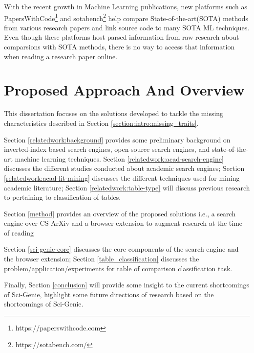 With the recent growth in Machine Learning publications, new platforms such as PapersWithCode\footnote{https://paperswithcode.com} and sotabench\footnote{https://sotabench.com/} help compare State-of-the-art(SOTA) methods from various research papers and link source code to many SOTA ML techniques. Even though these platforms host parsed information from raw research about comparsions with SOTA methods, there is no way to access that information when reading a research paper online. 

\section{Proposed Approach And Overview}
This dissertation focuses on the solutions developed to tackle the missing characteristics described in Section \ref{section:intro:missing_traits}. 

Section \ref{relatedwork:background} provides some preliminary background on inverted-index based search engines, open-source search engines, and state-of-the-art machine learning techniques.
Section \ref{relatedwork:acad-search-engine} discusses the different studies conducted about academic search engines; Section \ref{relatedwork:acad-lit-mining} discusses the different techniques used for mining academic literature; Section \ref{relatedwork:table-type} will discuss previous research to pertaining to classification of tables. 

Section \ref{method} provides an overview of the proposed solutions i.e., a search engine over CS ArXiv and a browser extension to augment research at the time of reading 

Section \ref{sci-genie-core} discusses the core components of the search engine and the browser extension; Section \ref{table_classification}
discusses the problem/application/experiments for table of comparison classification task.

Finally, Section \ref{conclusion} will provide some insight to the current shortcomings of Sci-Genie, highlight some future directions of research based on the shortcomings of Sci-Genie. 